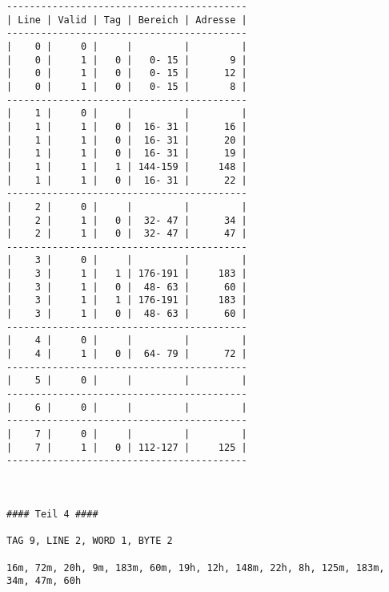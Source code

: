 \documentclass[10pt,a4paper]{article}
\begin{document}
\begin{lstlisting}
------------------------------------------
| Line | Valid | Tag | Bereich | Adresse |
------------------------------------------
|    0 |     0 |     |         |         |
|    0 |     1 |   0 |   0- 15 |       9 |
|    0 |     1 |   0 |   0- 15 |      12 |
|    0 |     1 |   0 |   0- 15 |       8 |
------------------------------------------
|    1 |     0 |     |         |         |
|    1 |     1 |   0 |  16- 31 |      16 |
|    1 |     1 |   0 |  16- 31 |      20 |
|    1 |     1 |   0 |  16- 31 |      19 |
|    1 |     1 |   1 | 144-159 |     148 |
|    1 |     1 |   0 |  16- 31 |      22 |
------------------------------------------
|    2 |     0 |     |         |         |
|    2 |     1 |   0 |  32- 47 |      34 |
|    2 |     1 |   0 |  32- 47 |      47 |
------------------------------------------
|    3 |     0 |     |         |         |
|    3 |     1 |   1 | 176-191 |     183 |
|    3 |     1 |   0 |  48- 63 |      60 |
|    3 |     1 |   1 | 176-191 |     183 |
|    3 |     1 |   0 |  48- 63 |      60 |
------------------------------------------
|    4 |     0 |     |         |         |
|    4 |     1 |   0 |  64- 79 |      72 |
------------------------------------------
|    5 |     0 |     |         |         |
------------------------------------------
|    6 |     0 |     |         |         |
------------------------------------------
|    7 |     0 |     |         |         |
|    7 |     1 |   0 | 112-127 |     125 |
------------------------------------------



#### Teil 4 ####

TAG 9, LINE 2, WORD 1, BYTE 2

16m, 72m, 20h, 9m, 183m, 60m, 19h, 12h, 148m, 22h, 8h, 125m, 183m, 34m, 47m, 60h


\end{lstlisting}
\end{document}

